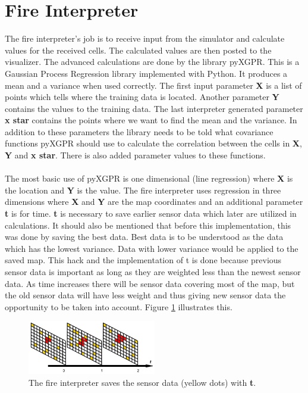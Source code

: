 \section{Fire Interpreter}

The fire interpreter's job is to receive input from the simulator and 
calculate values for the received cells. The calculated values are then posted to the visualizer. The advanced calculations are done by the library pyXGPR. This is a Gaussian Process Regression library implemented with Python. It produces a mean and a variance when used correctly. The first input parameter \textbf{X} is a list of points which tells where the training data is located. Another parameter \textbf{Y} contains the values to the training data. The last interpreter generated parameter \textbf{x star} contains the points where we want to find the mean and the variance. In addition to these parameters the library needs to be told what covariance functions pyXGPR should use to calculate the correlation between the cells in \textbf{X}, \textbf{Y} and \textbf{x star}. There is also added parameter values to these functions.
\\\\
The most basic use of pyXGPR is one dimensional (line regression) where \textbf{X} is the location and \textbf{Y} is the value. The fire interpreter uses regression in three dimensions where \textbf{X} and \textbf{Y} are the map coordinates and an additional parameter \textbf{t} is for time. \textbf{t} is necessary to save earlier sensor data which later are utilized in calculations. It should also be mentioned that before this implementation, this was done by saving the best data. Best data is to be understood as the data which has the lowest variance. Data with lower variance would be applied to the saved map. This hack and the implementation of t is done because previous sensor data is important as long as they are weighted less than the newest sensor data. As time increases there will be sensor data covering most of the map, but the old sensor data will have less weight and thus giving new sensor data the opportunity to be taken into account. Figure \ref{fig:timeElapse} illustrates this.
\begin{figure}[here]
  \centering
      \includegraphics[width=0.5\textwidth]{solution/graphics/timeElapse.png}
  \caption{The fire interpreter saves the sensor data (yellow dots) with \textbf{t}.}
  \label{fig:timeElapse}
\end{figure}
